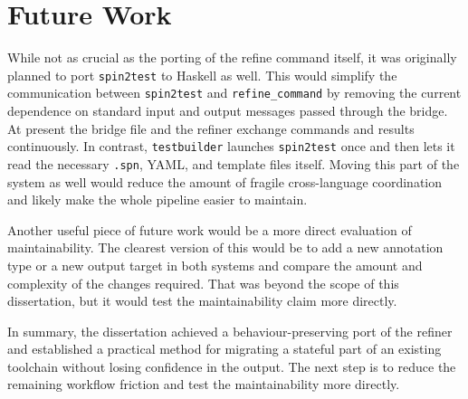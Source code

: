 \section{Future Work}


While not as crucial as the porting of the refine command itself, it was originally planned to port \texttt{spin2test} to Haskell as well. This would simplify the communication between \texttt{spin2test} and \texttt{refine\_command} by removing the current dependence on standard input and output messages passed through the bridge. At present the bridge file and the refiner exchange commands and results continuously. In contrast, \texttt{testbuilder} launches \texttt{spin2test} once and then lets it read the necessary \texttt{.spn}, YAML, and template files itself. Moving this part of the system as well would reduce the amount of fragile cross-language coordination and likely make the whole pipeline easier to maintain.

Another useful piece of future work would be a more direct evaluation of maintainability. The clearest version of this would be to add a new annotation type or a new output target in both systems and compare the amount and complexity of the changes required. That was beyond the scope of this dissertation, but it would test the maintainability claim more directly.




In summary, the dissertation achieved a behaviour-preserving port of the refiner and established a practical method for migrating a stateful part of an existing toolchain without losing confidence in the output. The next step is to reduce the remaining workflow friction and test the maintainability  more directly.